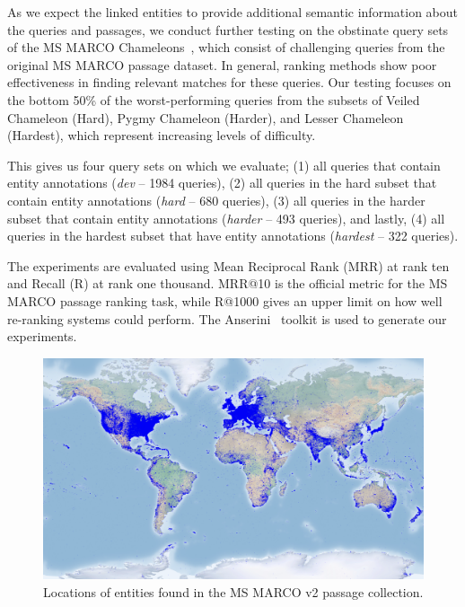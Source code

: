 As we expect the linked entities to provide additional semantic information about the queries and passages, we conduct further testing on the obstinate query sets of the MS MARCO Chameleons~\citep{chameleons}, which consist of challenging queries from the original MS MARCO passage dataset. In general, ranking methods show poor effectiveness in finding relevant matches for these queries. Our testing focuses on the bottom 50\% of the worst-performing queries from the subsets of Veiled Chameleon (Hard), Pygmy Chameleon (Harder), and Lesser Chameleon (Hardest), which represent increasing levels of difficulty. 

This gives us four query sets on which we evaluate; (1) all queries that contain entity annotations (\emph{dev} -- 1984 queries), (2) all queries in the hard subset that contain entity annotations (\emph{hard} -- 680 queries), (3) all queries in the harder subset that contain entity annotations (\emph{harder} -- 493 queries), and lastly, (4) all queries in the hardest subset that have entity annotations (\emph{hardest} -- 322 queries).

The experiments are evaluated using Mean Reciprocal Rank (MRR) at rank ten and Recall (R) at rank one thousand. MRR@10 is the official metric for the MS MARCO passage ranking task, while R@1000 gives an upper limit on how well re-ranking systems could perform. The Anserini~\citep{anserini} toolkit is used to generate our experiments. 

\begin{figure}
	\centering
	\includegraphics[width=.9\textwidth]{imgs/basemap_shaded_blue_opa.png}
	\caption{Locations of entities found in the MS MARCO v2 passage collection.}
	\label{fig:entity_map}
\end{figure}

